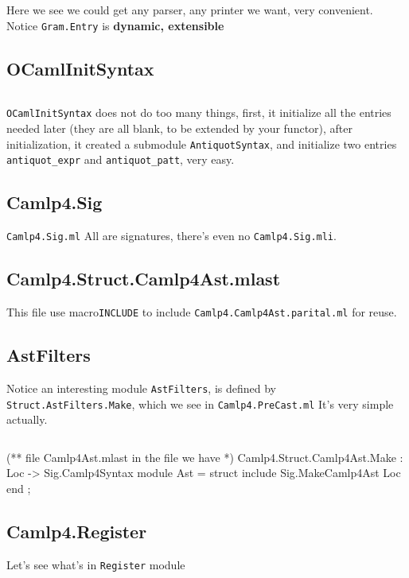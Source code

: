 Here we see we could get any parser, any printer we want, very convenient.
Notice \verb|Gram.Entry| is \textbf{ dynamic, extensible}


\subsection{OCamlInitSyntax}
\inputminted[fontsize=\scriptsize,
             firstline=55]{ocaml}{camlp4/code/PreCast_OCamlInitSyntax.ml}
\verb|OCamlInitSyntax| does not do too many things, first, it
initialize all the entries needed later (they are all blank, to be
extended by your functor), after initialization, it created a
submodule \verb|AntiquotSyntax|, and initialize two entries
\verb|antiquot_expr| and \verb|antiquot_patt|, very easy. 


\subsection{Camlp4.Sig}
\verb|Camlp4.Sig.ml| All are signatures, there's even no
\verb|Camlp4.Sig.mli|.



\subsection{Camlp4.Struct.Camlp4Ast.mlast} 

This file use macro\verb|INCLUDE| to include
\verb|Camlp4.Camlp4Ast.parital.ml| for reuse.


\subsection{AstFilters}    
Notice an interesting module \verb|AstFilters|, is defined by
\verb|Struct.AstFilters.Make|, which we see in
\verb|Camlp4.PreCast.ml| It's very simple actually.
\label{AstFilters}
\inputminted[fontsize=\scriptsize,]{ocaml}{camlp4/code/AstFilters.ml}



\begin{ocamlcode}
(** file Camlp4Ast.mlast 
  in the file we have *)
Camlp4.Struct.Camlp4Ast.Make : Loc -> Sig.Camlp4Syntax
  module Ast = struct
     include Sig.MakeCamlp4Ast Loc 
  end ;
\end{ocamlcode}

\subsection{Camlp4.Register}
Let's see what's in \verb|Register| module
\inputminted[fontsize=\scriptsize,
            ]{ocaml}{camlp4/code/Register.ml}


